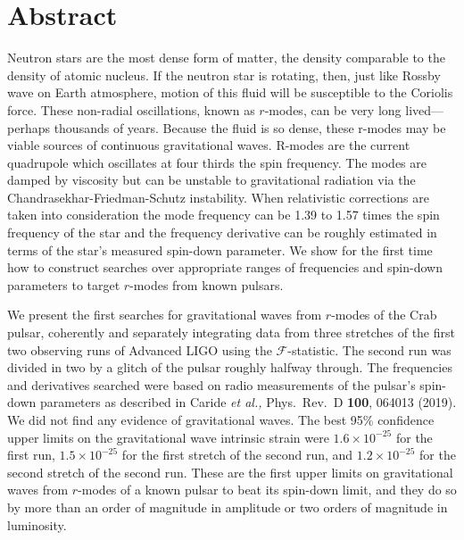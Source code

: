 \documentclass{ttuthes2007}
\begin{document}
\tableofcontents	%

\chapter{\textbf{Abstract}}
Neutron stars are the most dense form of matter, the density comparable to the
density of atomic nucleus.  If the neutron star is rotating, then, just like
Rossby wave on Earth atmosphere, motion of this fluid will be susceptible to the
Coriolis force. These non-radial oscillations, known as $r$-modes, can be very
long lived---perhaps thousands of years. Because the fluid is so dense, these
r-modes may be viable sources of continuous gravitational waves.  R-modes are
the current quadrupole which oscillates at four thirds the spin frequency. The
modes are damped by viscosity but can be unstable to gravitational radiation via
the Chandrasekhar-Friedman-Schutz instability. When relativistic corrections are
taken into consideration the mode frequency can be 1.39 to 1.57 times the spin
frequency of the star and the frequency derivative can be roughly estimated in
terms of the star's measured spin-down parameter. We show for the first time how
to construct searches over appropriate ranges of frequencies and spin-down
parameters to target $r$-modes from known pulsars. 

We present the first searches for gravitational waves from $r$-modes of the Crab
pulsar, coherently and separately integrating data from three stretches of the  
first two observing runs of Advanced LIGO using the $\mathcal{F}$-statistic.    
The second run was divided in two by a glitch of the pulsar roughly halfway     
through.  The frequencies and derivatives searched were based on radio          
measurements of the pulsar's spin-down parameters as described in Caride        
\textit{et al.,} Phys.\ Rev.\ D \textbf{100}, 064013 (2019).  We did not find   
any evidence of gravitational waves. The best 95\% confidence upper limits on   
the gravitational wave intrinsic strain were $1.6\times10^{-25}$ for the first  
run, $1.5\times10^{-25}$ for the first stretch of the second run, and           
$1.2\times10^{-25}$ for the second stretch of the second run. These are the     
first upper limits on gravitational waves from $r$-modes of a known pulsar to   
beat its spin-down limit, and they do so by more than an order of magnitude in  
amplitude or two orders of magnitude in luminosity.                             
                                          
\end{document}

